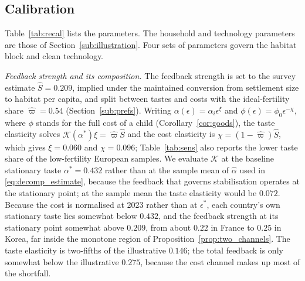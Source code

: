 \documentclass[11pt]{article}
\begin{document}
\subsection{Calibration}
\label{sub:recal}
Table~\ref{tab:recal} lists the parameters. The household and technology parameters are those of
Section~\ref{sub:illustration}. Four sets of parameters govern the habitat block and clean technology.

\emph{Feedback strength and its composition.} The feedback strength is set to the survey estimate
$\hat S=0.209$, implied under the maintained conversion from settlement size to habitat per capita, and
split between tastes and costs with the ideal-fertility share $\hat\varpi=0.54$
(Section~\ref{sub:prefs}). Writing $\alpha(\epsilon)=\alpha_i\epsilon^{\xi}$ and
$\phi(\epsilon)=\phi_0\epsilon^{-\chi}$, where $\phi$ stands for the full cost of a child
(Corollary~\ref{cor:goods}), the taste elasticity solves $\mathcal{K}(\alpha^\ast)\xi=\hat\varpi\hat S$
and the cost elasticity is $\chi=(1-\hat\varpi)\hat S$, which gives $\xi=0.060$ and $\chi=0.096$;
Table~\ref{tab:sens} also reports the lower taste share of the low-fertility European samples. We
evaluate $\mathcal{K}$ at the baseline stationary taste $\alpha^\ast=0.432$ rather than at the sample mean
of $\hat\alpha$ used in \eqref{eq:decomp_estimate}, because the feedback that governs stabilisation
operates at the stationary point; at the sample mean the taste elasticity would be $0.072$. Because the
cost is normalised at 2023 rather than at $\epsilon^\ast$, each country's own stationary taste lies
somewhat below $0.432$, and the feedback strength at its stationary point somewhat above $0.209$, from
about $0.22$ in France to $0.25$ in Korea, far inside the monotone region of
Proposition~\ref{prop:two_channels}. The taste elasticity is two-fifths of the illustrative $0.146$; the
total feedback is only somewhat below the illustrative $0.275$, because the cost channel makes up most of
the shortfall.
\end{document}
